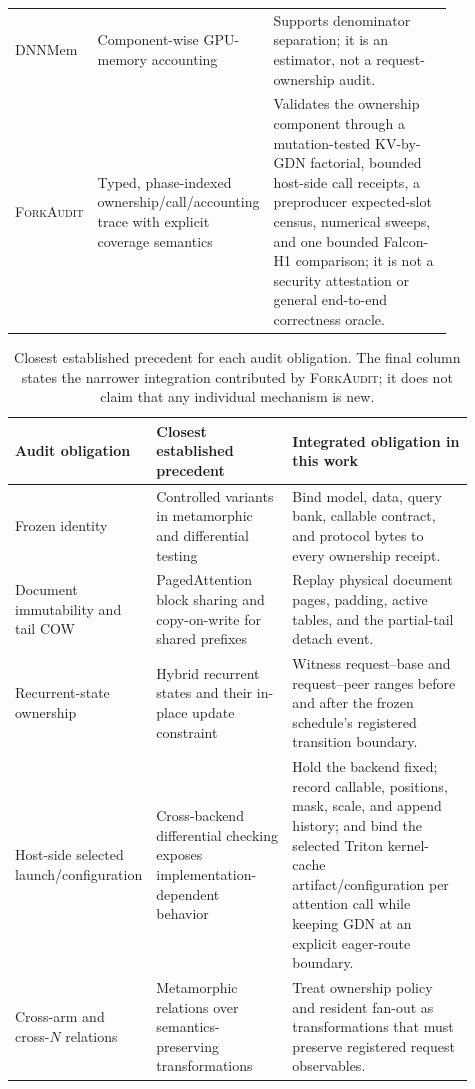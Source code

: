 \documentclass{article}
\newcommand{\method}{\textsc{ForkAudit}}
\begin{document}
\begin{table}[H]
\begin{tabular}{@{}p{0.16\linewidth}p{0.28\linewidth}p{0.43\linewidth}@{}}
    DNNMem & Component-wise GPU-memory accounting~\citep{gao2020dnnmem} & Supports denominator separation; it is an estimator, not a request-ownership audit. \\
    \method{} & Typed, phase-indexed ownership/call/accounting trace with explicit coverage semantics & Validates the ownership component through a mutation-tested KV-by-GDN factorial, bounded host-side call receipts, a preproducer expected-slot census, numerical sweeps, and one bounded Falcon-H1 comparison; it is not a security attestation or general end-to-end correctness oracle. \\
    \bottomrule
  \end{tabular}
\end{table}

\begin{table}[H]
\caption{Closest established precedent for each audit obligation.  The final
column states the narrower integration contributed by \method{}; it does not
claim that any individual mechanism is new.}
\centering\scriptsize
\begin{tabular}{@{}p{0.18\linewidth}p{0.31\linewidth}p{0.42\linewidth}@{}}
\toprule
Audit obligation & Closest established precedent & Integrated obligation in this work \\
\midrule
Frozen identity & Controlled variants in metamorphic and differential testing~\citep{chen2018metamorphic,xiao2022metamorphic,pham2019cradle} & Bind model, data, query bank, callable contract, and protocol bytes to every ownership receipt. \\
Document immutability and tail COW & PagedAttention block sharing and copy-on-write for shared prefixes~\citep{kwon2023pagedattention} & Replay physical document pages, padding, active tables, and the partial-tail detach event. \\
Recurrent-state ownership & Hybrid recurrent states and their in-place update constraint~\citep{yang2025gateddeltanet,pan2025marconi} & Witness request--base and request--peer ranges before and after the frozen schedule's registered transition boundary. \\
Host-side selected launch/configuration & Cross-backend differential checking exposes implementation-dependent behavior~\citep{pham2019cradle} & Hold the backend fixed; record callable, positions, mask, scale, and append history; and bind the selected Triton kernel-cache artifact/configuration per attention call while keeping GDN at an explicit eager-route boundary. \\
Cross-arm and cross-$N$ relations & Metamorphic relations over semantics-preserving transformations~\citep{chen2018metamorphic,xiao2022metamorphic} & Treat ownership policy and resident fan-out as transformations that must preserve registered request observables. \\

\end{tabular}
\end{table}
\end{document}

